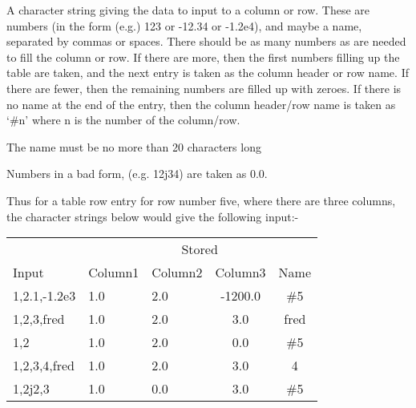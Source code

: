 \begin{small}
{{{  A character string giving the data to input to a column or row.
  These are numbers (in the form (e.g.) 123 or -12.34 or -1.2e4),
  and maybe a name, separated by commas or spaces. There should
  be as many numbers as are needed to fill the column or row. If
  there are more, then the first numbers filling up the table
  are taken, and the next entry is taken as the column header or
  row name. If there are fewer, then the remaining numbers are
  filled up with zeroes. If there is no name at the end of the
  entry, then the column header/row name is taken as `\#n' where
  n is the number of the column/row.

  The name must be no more than 20 characters long

  Numbers in a bad form, (e.g. 12j34) are taken as 0.0.

  Thus for a table row entry for row number five, where there are
  three columns, the character strings below would give the following
  input:-

\begin{tabular}{|l|l|l|c|c|}\hline
                    & \multicolumn{4}{c|}{Stored}  \\ \cline{2-5}
    Input           &  Column1  &  Column2 &  Column3  &  Name \\ \hline
    1,2.1,-1.2e3     &    1.0    &   2.0     &  -1200.0  &  \#5 \\
    1,2,3,fred       &    1.0    &   2.0     &     3.0   &  fred \\
    1,2              &    1.0    &   2.0     &     0.0   &  \#5 \\
    1,2,3,4,fred     &    1.0    &   2.0     &     3.0   &  4 \\
    1,2j2,3          &    1.0    &   0.0     &     3.0   &  \#5 \\ \hline
\end{tabular}

}}}
\end{small}
